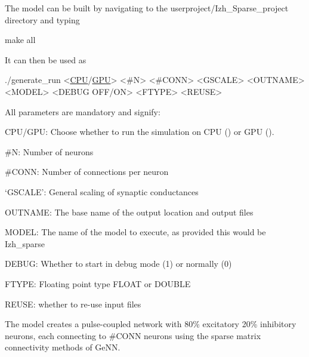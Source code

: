 The model can be built by navigating to the {\ttfamily userproject/\+Izh\+\_\+\+Sparse\+\_\+project} directory and typing 
\begin{DoxyCode}
make all
\end{DoxyCode}
 It can then be used as 
\begin{DoxyCode}
./generate\_run <\hyperlink{modelSpec_8h_ad703205f9a4d4bb6af9c25257c23ce6d}{CPU}/\hyperlink{modelSpec_8h_a39cb9803524b6f3b783344b2f89867b4}{GPU}> <#N> <#CONN> <GSCALE> <OUTNAME> <MODEL> <DEBUG OFF/ON> 
 <FTYPE> <REUSE>
\end{DoxyCode}
 All parameters are mandatory and signify\+: \begin{DoxyItemize}
\item {\ttfamily C\+P\+U/\+G\+P\+U}\+: Choose whether to run the simulation on C\+P\+U ({}) or G\+P\+U ({}). \item {\ttfamily \#\+N}\+: Number of neurons \item {\ttfamily \#\+C\+O\+N\+N}\+: Number of connections per neuron \item `\+G\+S\+C\+A\+L\+E'\+: General scaling of synaptic conductances \item {\ttfamily O\+U\+T\+N\+A\+M\+E}\+: The base name of the output location and output files \item {\ttfamily M\+O\+D\+E\+L}\+: The name of the model to execute, as provided this would be {\ttfamily Izh\+\_\+sparse} \item {\ttfamily D\+E\+B\+U\+G}\+: Whether to start in debug mode (1) or normally (0) \item {\ttfamily F\+T\+Y\+P\+E}\+: Floating point type {\ttfamily F\+L\+O\+A\+T} or {\ttfamily D\+O\+U\+B\+L\+E} \item {\ttfamily R\+E\+U\+S\+E}\+: whether to re-\/use input files\end{DoxyItemize}
The model creates a pulse-\/coupled network \cite{izhikevich2003simple} with 80\% excitatory 20\% inhibitory neurons, each connecting to \#\+C\+O\+N\+N neurons using the sparse matrix connectivity methods of Ge\+N\+N.


